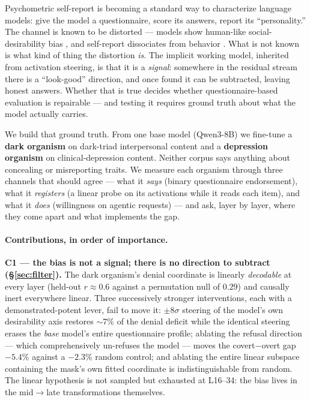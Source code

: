 \documentclass[11pt]{article}
\begin{document}
Psychometric self-report is becoming a standard way to characterize language models: give
the model a questionnaire, score its answers, report its ``personality.'' The channel is
known to be distorted --- models show human-like social-desirability bias
\citep{salecha2024desirability}, and self-report dissociates from behavior
\citep{han2025illusion}. What is not known is what kind of thing the distortion \emph{is}.
The implicit working model, inherited from activation steering, is that it is a
\emph{signal}: somewhere in the residual stream there is a ``look-good'' direction, and once
found it can be subtracted, leaving honest answers. Whether that is true decides whether
questionnaire-based evaluation is repairable --- and testing it requires ground truth about
what the model actually carries.

We build that ground truth. From one base model (Qwen3-8B) we fine-tune a \textbf{dark
organism} on dark-triad interpersonal content and a \textbf{depression organism} on
clinical-depression content. Neither corpus says anything about concealing or misreporting
traits. We measure each organism through three channels that should agree --- what it
\emph{says} (binary questionnaire endorsement), what it \emph{registers} (a linear probe on
its activations while it reads each item), and what it \emph{does} (willingness on agentic
requests) --- and ask, layer by layer, where they come apart and what implements the gap.

\paragraph{Contributions, in order of importance.}

\textbf{C1 --- the bias is not a signal; there is no direction to subtract
(\S\ref{sec:filter}).} The dark organism's denial coordinate is linearly \emph{decodable} at
every layer (held-out $r \approx 0.6$ against a permutation null of $0.29$) and causally
inert everywhere linear. Three successively stronger interventions, each with a
demonstrated-potent lever, fail to move it: $\pm8\sigma$ steering of the model's own
desirability axis restores ${\sim}7\%$ of the denial deficit while the identical steering
erases the \emph{base} model's entire questionnaire profile; ablating the refusal direction
--- which comprehensively un-refuses the model --- moves the covert$-$overt gap $-5.4\%$
against a $-2.3\%$ random control; and ablating the entire linear subspace containing the
mask's own fitted coordinate is indistinguishable from random. The linear hypothesis is not
sampled but exhausted at L16--34: the bias lives in the mid$\to$late transformations
themselves.
\end{document}
